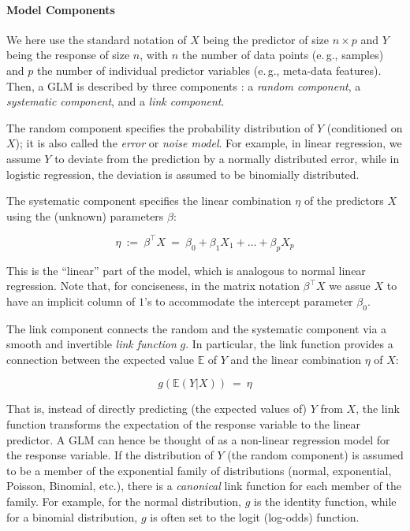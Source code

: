 \paragraph{Model Components}
\label{ch:Factorization:sec:Methods:sub:GLMs:par:Overview}

We here use the standard notation of $X$ being the predictor of size $n \times p$ and $Y$ being the response of size $n$,
with $n$ the number of data points (e.\,g., samples)
and $p$ the number of individual predictor variables (e.\,g., meta-data features).
Then, a \ac{GLM} is described by three components \cite{McCullagh1989}:
a \emph{random component}, a \emph{systematic component}, and a \emph{link component}.

The random component specifies the probability distribution of $Y$ (conditioned on $X$);
it is also called the \emph{error} or \emph{noise model}.
For example, in linear regression, we assume $Y$ to deviate from the prediction by a normally distributed error,
while in logistic regression, the deviation is assumed to be binomially distributed.

The systematic component specifies the linear combination $\eta$ of the predictors $X$
using the (unknown) parameters $\beta$:

\begin{equation}
\label{ch:Factorization:sub:GLM:eq:eta}
    \eta ~:=~ \beta^\intercal X ~=~ \beta_0 + \beta_1 X_1 + \dots + \beta_p X_p
\end{equation}

This is the ``linear'' part of the model, which is analogous to normal linear regression.
Note that, for conciseness, in the matrix notation $\beta^\intercal X$ we assue $X$ to have
an implicit column of $1$'s to accommodate the intercept parameter $\beta_0$.

The link component connects the random and the systematic component via a smooth and invertible \emph{link function} $g$.
In particular, the link function provides a connection between the expected value $\mathbb{E}$ of $Y$
and the linear combination $\eta$ of $X$:

\begin{equation}
\label{ch:Factorization:sub:GLM:eq:link}
    g(\mathbb{E}(Y|X)) ~=~ \eta
\end{equation}

That is, instead of directly predicting (the expected values of) $Y$ from $X$,
the link function transforms the expectation of the response variable to the linear predictor.
A \ac{GLM} can hence be thought of as a non-linear regression model for the response variable.
If the distribution of $Y$ (the random component) is assumed
to be a member of the exponential family of distributions (normal, exponential, Poisson, Binomial, etc.),
there is a \emph{canonical} link function for each member of the family.
For example, for the normal distribution, $g$ is the identity function,
while for a binomial distribution, $g$ is often set to the logit (log-odds) function.

